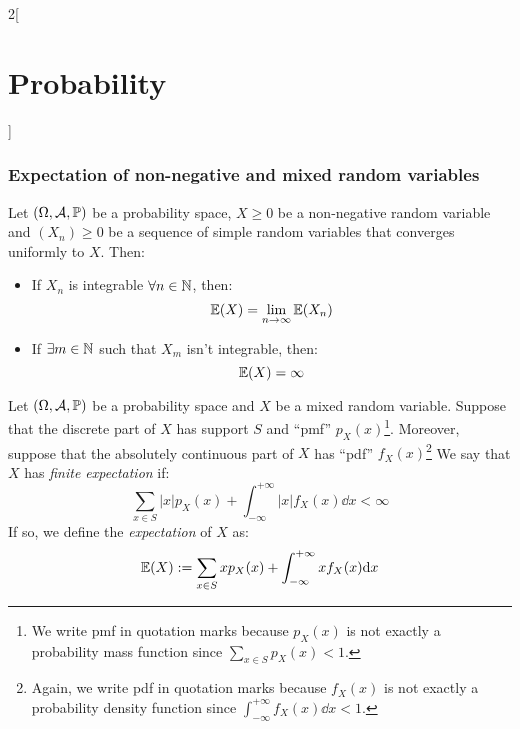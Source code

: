 \documentclass[../../../main.tex]{subfiles}
\begin{document}
\begin{multicols}{2}[\section{Probability}]
  \subsubsection{Expectation of non-negative and mixed random variables}
  \begin{prop}
    Let $(\Omega,\mathcal{A},\mathbb{P})$ be a probability space, $X\geq 0$ be a non-negative random variable and $(X_n)\geq 0$ be a sequence of simple random variables that converges uniformly to $X$. Then:
    \begin{itemize}
      \item If $X_n$ is integrable $\forall n\in\mathbb{N}$, then: $$\mathbb{E}(X)=\lim_{n\to\infty}\mathbb{E}(X_n)$$
      \item If $\exists m\in\mathbb{N}$ such that $X_m$ isn't integrable, then: $$\mathbb{E}(X)=\infty$$
    \end{itemize}
  \end{prop}
  \begin{definition}
    Let $(\Omega,\mathcal{A},\mathbb{P})$ be a probability space and $X$ be a mixed random variable. Suppose that the discrete part of $X$ has support $S$ and ``pmf'' $p_X(x)$\footnote{We write pmf in quotation marks because $p_X(x)$ is not exactly a probability mass function since $\sum_{x\in S}p_X(x)<1$.}. Moreover, suppose that the absolutely continuous part of $X$ has ``pdf'' $f_X(x)$\footnote{Again, we write pdf in quotation marks because $f_X(x)$ is not exactly a probability density function since $\int_{-\infty}^{+\infty}f_X(x)\dd x<1$.} We say that $X$ has \textit{finite expectation} if: $$\sum_{x\in S}|x|p_X(x)+\int_{-\infty}^{+\infty}|x|f_X(x)\dd x<\infty$$
    If so, we define the \textit{expectation} of $X$ as: $$\mathbb{E}(X):=\sum_{x\in S}xp_X(x)+\int_{-\infty}^{+\infty}xf_X(x)\dd x$$
  \end{definition}

\end{multicols}
\end{document}
